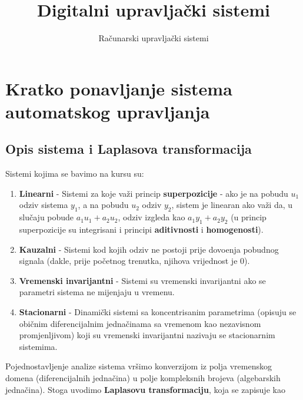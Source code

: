 \documentclass[12pt]{IEEEtran}
\title{Digitalni upravlja\v{c}ki sistemi}
\author{Ra\v{c}unarski upravlja\v{c}ki sistemi}
\numberwithin{equation}{subsection}
\numberwithin{figure}{section}
\begin{document}
\maketitle

\tableofcontents

\newpage
\section{\textbf{Kratko ponavljanje sistema automatskog upravljanja}}
\vspace{12pt}

\subsection{\textbf{Opis sistema i Laplasova transformacija}}
Sistemi kojima se bavimo na kursu su:

\begin{enumerate}
    \item \textbf{Linearni} - Sistemi za koje va\v{z}i princip \textbf{superpozicije} -
          ako je na pobudu $u_1$ odziv sistema $y_1$, a na pobudu $u_2$ odziv $y_2$, sistem
          je linearan ako va\v{z}i da, u slu\v{c}aju pobude $a_1u_1 + a_2u_2$, odziv izgleda kao
          $a_1y_1 + a_2y_2$ (u princip superpozicije su integrisani i principi \textbf{aditivnosti}
          i \textbf{homogenosti}).
    \item \textbf{Kauzalni} - Sistemi kod kojih odziv ne postoji prije
          dovo\dj{}enja pobudnog signala (dakle, prije po\v{c}etnog trenutka,
          njihova vrijednost je $0$).
    \item \textbf{Vremenski invarijantni} - Sistemi su vremenski invarijantni ako se parametri
          sistema ne mijenjaju u vremenu.
    \item \textbf{Stacionarni} - Dinami\v{c}ki sistemi sa koncentrisanim parametrima
          (opisuju se obi\v{c}nim diferencijalnim jedna\v{c}inama sa vremenom kao nezavisnom promjenljivom)
          koji su vremenski invarijantni nazivaju se stacionarnim sistemima.
\end{enumerate}

\vspace{12pt}

Pojednostavljenje analize sistema vr\v{s}imo konverzijom iz polja vremenskog
domena (diferencijalnih jedna\v{c}ina) u polje kompleksnih brojeva (algebarskih jedna\v{c}ina).
Stoga uvodimo \textbf{Laplasovu transformaciju}, koja se zapisuje kao
\end{document}
